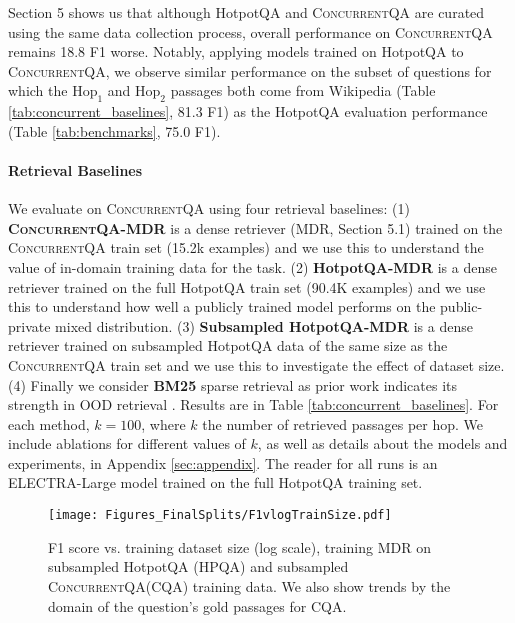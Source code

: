 \documentclass{article}
\renewcommand\cite{\citep}	\newcommand\shortcite{\citeyearpar}\newcommand\newcite{\citet}
\newcommand{\datasetname}{\textsc{ConcurrentQA}\xspace}
\begin{document}
Section 5 shows us that although HotpotQA and \datasetname are curated using the same data collection process, overall performance on \datasetname remains 18.8 F1 worse. Notably, applying models trained on HotpotQA to \datasetname, we observe similar performance on the subset of questions for which the $\mathrm{Hop_1}$ and $\mathrm{Hop_2}$ passages both come from Wikipedia (Table \ref{tab:concurrent_baselines}, 81.3 F1) as the HotpotQA evaluation performance (Table \ref{tab:benchmarks}, 75.0 F1).

\paragraph{Retrieval Baselines} We evaluate on \datasetname using four retrieval baselines: (1) \textbf{\datasetname-MDR} is a dense retriever (MDR, Section 5.1) trained on the \datasetname train set (15.2k examples) and we use this to understand the value of in-domain training data for the task. (2) \textbf{HotpotQA-MDR} is a dense retriever trained on the full HotpotQA train set (90.4K examples) and we use this to understand how well a publicly trained model performs on the public-private mixed distribution. (3) \textbf{Subsampled HotpotQA-MDR} is a dense retriever trained on subsampled HotpotQA data of the same size as the \datasetname train set and we use this to investigate the effect of dataset size. (4) Finally we consider \textbf{BM25} sparse retrieval as prior work indicates its strength in OOD retrieval \cite{thakur2021beir}. Results are in Table \ref{tab:concurrent_baselines}. For each method, $k=100$, where $k$ the number of retrieved passages per hop. We include ablations for different values of $k$, as well as details about the models and experiments, in Appendix \ref{sec:appendix}. The reader for all runs is an ELECTRA-Large model trained on the full HotpotQA training set. 


\begin{figure}[t!]
    \centering
    \texttt{[image: Figures\_FinalSplits/F1vlogTrainSize.pdf]}
    \caption[width=\linewidth]{F1 score vs. training dataset size (log scale), training MDR on subsampled HotpotQA (HPQA) and subsampled \datasetname (CQA) training data. We also show trends by the domain of the question's gold passages for CQA.}
    \label{fig:train_size}
    \vspace{-2mm}
\end{figure}
\end{document}
